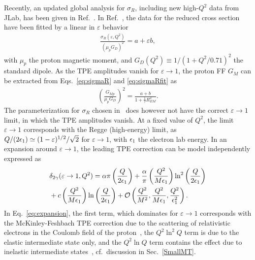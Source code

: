 Recently, an updated global analysis for $\sigma_R$, including new high-$Q^2$ data from JLab, has been given in Ref.~\cite{Christy:2021snt}.
In Ref.~\cite{Christy:2021snt}, the data for the reduced cross section have been fitted by a linear in $\varepsilon$ behavior
\begin{eqnarray}
\frac{\sigma_R(\varepsilon, Q^2)}{(\mu_p G_D)^2} = a + \varepsilon b,   
\label{eq:sigmaRfit}
 \end{eqnarray}
 with $\mu_p$ the proton magnetic moment, and $G_D(Q^2) \equiv 1/(1 + Q^2/0.71)^2$ the standard dipole. 
 As the TPE amplitudes vanish for $\varepsilon \to 1$, the proton FF $G_M$ can be extracted from Eqs.~\ref{eq:sigmaR} and \ref{eq:sigmaRfit} as
\begin{eqnarray}
 \left( \frac{G_{Mp} }{ \mu_p G_D} \right)^2 = \frac{a + b }{1 + \frac{1}{\tau} R_{EM}^2}.
 \label{eq:GMfit}
 \end{eqnarray}
The parameterization for $\sigma_R$ chosen in~\cite{Christy:2021snt} does however not have the correct $\varepsilon \to 1$ limit, in which  
the TPE amplitudes vanish.  
At a fixed value of $Q^2$, the limit $\varepsilon \to 1$ corresponds with the Regge (high-energy) limit, as 
$Q/(2\epsilon_1) \simeq (1 - \varepsilon)^{1/2} / \sqrt{2}$ for $\varepsilon \to 1$, with $\epsilon_1$ the electron lab energy.
In an expansion around $\varepsilon \to 1$, the leading TPE correction can be model independently expressed as~\cite{Tomalak:2015aoa} 
\begin{align}
& \delta_{2 \gamma}(\varepsilon \to 1, Q^2) = \alpha \pi \left(\frac{Q}{2 \epsilon_1}\right) + \frac{\alpha }{\pi} \left(\frac{Q^2}{M\epsilon_1} \right)  \ln^2 \left(\frac{Q}{2\epsilon_1} \right) \nonumber \\ &
+ c \left(\frac{Q^2}{M\epsilon_1} \right)  \ln \left(\frac{Q}{2\epsilon_1} \right) + 
 {\mathcal O}\left( \frac{Q^2}{M^2}, \frac{Q^2}{M \epsilon_1}, \frac{Q^2}{\epsilon_1^2}\right).
 \label{eq:expansion}
 \end{align}
In Eq.~\ref{eq:expansion}, the first term, which dominates for $\varepsilon \to 1$ corresponds with the McKinley-Feshbach TPE correction due to the scattering of relativistic electrons in the Coulomb field of the proton~\cite{McKinley:1948zz}, the $Q^2 \ln^2 Q$ term is due to the elastic intermediate state only, and the $Q^2 \ln Q$ term contains the effect due to inelastic intermediate states~\cite{Brown:1970te,Tomalak:2015aoa}, cf.\ discussion in Sec.~\ref{SmallMT}.



